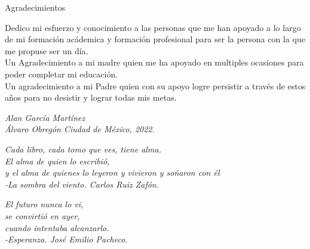\documentclass[12pt]{book} %
\begin{document}
\clearpage\hbox{}\thispagestyle{empty}\newpage

\begin{center}
\huge{Agradecimientos}
\end{center}

\vspace{1cm}

Dedico mi esfuerzo y conocimiento a las personas que me han apoyado a lo largo de mi formación acádemica y formación profesional para ser la persona con la que me propuse ser un día.\\
Un Agradecimiento a mi madre quien me ha apoyado en multiples ocasiones para poder completar mi educación.\\
Un agradecimiento a mi Padre quien con su apoyo logre persistir a través de estos años para no desistir y lograr todas mis metas.


\begin{flushright}
\textit{Alan García Martínez \\
Álvaro Obregón Ciudad de México, 2022.
}
\end{flushright}

\newpage


\hspace{5cm}


\newpage %

\clearpage\hbox{}\thispagestyle{empty}\newpage


\begin{flushright}
\textit{ Cada libro, cada tomo que ves, tiene alma. \\
El alma de quien lo escribió,\\
 y el alma de quienes lo leyeron y vivieron y soñaron con él \\ [0.5cm]
-La sombra del viento. Carlos Ruiz Zafón.}
\end{flushright}

\vspace{5cm}

\begin{flushleft}

\textit{ El futuro nunca lo vi,\\
se convirtió en ayer, \\
cuando intentaba alcanzarlo.\\[0.5cm]
-Esperanza. José Emilio Pacheco.}
\end{flushleft}
\end{document}
